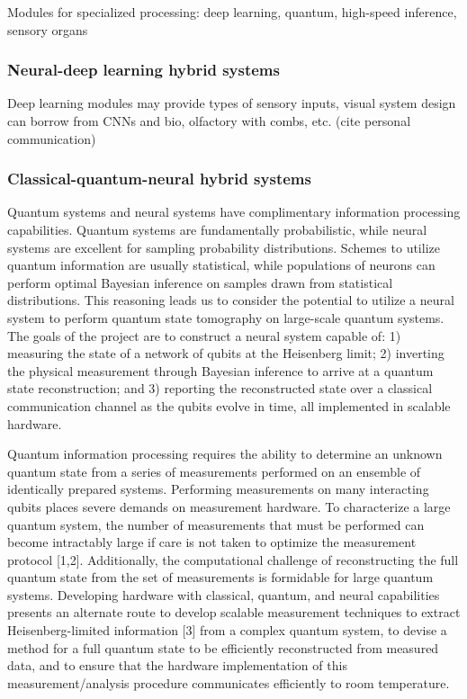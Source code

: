 \documentclass[twocolumn]{article}
\begin{document}
Modules for specialized processing: deep learning, quantum, high-speed inference, sensory organs

\subsubsection{Neural-deep learning hybrid systems}
Deep learning modules may provide types of sensory inputs, visual system design can borrow from CNNs and bio, olfactory with combs, etc. (cite personal communication)

\subsubsection{Classical-quantum-neural hybrid systems}
Quantum systems and neural systems have complimentary information processing capabilities. Quantum systems are fundamentally probabilistic, while neural systems are excellent for sampling probability distributions. Schemes to utilize quantum information are usually statistical, while populations of neurons can perform optimal Bayesian inference on samples drawn from statistical distributions. This reasoning leads us to consider the potential to utilize a neural system to perform quantum state tomography on large-scale quantum systems. The goals of the project are to construct a neural system capable of: 1) measuring the state of a network of qubits at the Heisenberg limit; 2) inverting the physical measurement through Bayesian inference to arrive at a quantum state reconstruction; and 3) reporting the reconstructed state over a classical communication channel as the qubits evolve in time, all implemented in scalable hardware.

Quantum information processing requires the ability to determine an unknown quantum state from a series of measurements performed on an ensemble of identically prepared systems. Performing measurements on many interacting qubits places severe demands on measurement hardware. To characterize a large quantum system, the number of measurements that must be performed can become intractably large if care is not taken to optimize the measurement protocol [1,2]. Additionally, the computational challenge of reconstructing the full quantum state from the set of measurements is formidable for large quantum systems. Developing hardware with classical, quantum, and neural capabilities presents an alternate route to develop scalable measurement techniques to extract Heisenberg-limited information [3] from a complex quantum system, to devise a method for a full quantum state to be efficiently reconstructed from measured data, and to ensure that the hardware implementation of this measurement/analysis procedure communicates efficiently to room temperature. 
\end{document}

